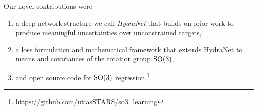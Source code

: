 Our novel contributions were
\begin{enumerate}
\item a deep network structure we call \textit{HydraNet} that builds on prior work \citep{Lakshminarayanan2017,Osband2016} to produce meaningful uncertainties over unconstrained targets,
\item a loss formulation and mathematical framework that extends HydraNet to means and covariances of the rotation group $\mathrm{SO}(3)$,
\item and open source code for $\mathrm{SO}(3)$ regression.\footnote{\url{https://github.com/utiasSTARS/so3_learning}}
\end{enumerate}


